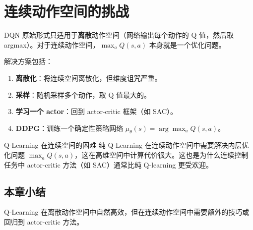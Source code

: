 \section{连续动作空间的挑战}

DQN 原始形式只适用于\textbf{离散}动作空间（网络输出每个动作的 Q 值，然后取 argmax）。对于连续动作空间，$\max_a Q(s,a)$ 本身就是一个优化问题。

解决方案包括：
\begin{enumerate}
    \item \textbf{离散化}：将连续空间离散化，但维度诅咒严重。
    \item \textbf{采样}：随机采样多个动作，取 Q 值最大的。
    \item \textbf{学习一个 actor}：回到 actor-critic 框架（如 SAC）。
    \item \textbf{DDPG}：训练一个确定性策略网络 $\mu_\theta(s) = \arg\max_a Q(s,a)$。
\end{enumerate}

\begin{warningbox}{Q-Learning 在连续空间的困难}
纯 Q-Learning 在连续动作空间中需要解决内层优化问题 $\max_a Q(s,a)$，这在高维空间中计算代价很大。这也是为什么连续控制任务中 actor-critic 方法（如 SAC）通常比纯 Q-learning 更受欢迎。
\end{warningbox}

\subsection{本章小结}
 
Q-Learning 在离散动作空间中自然高效，但在连续动作空间中需要额外的技巧或回归到 actor-critic 方法。

